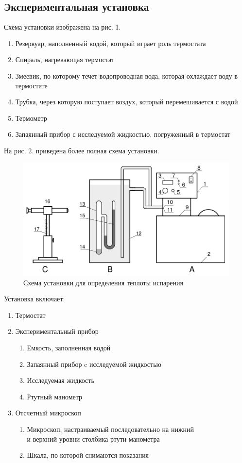 \documentclass[a4paper,12pt]{article}
\theoremstyle{plain} %
\theoremstyle{definition} %
\theoremstyle{remark} %
\begin{document}
\subsection{Экспериментальная установка}
\noindent Схема установки изображена на рис. 1. 
\begin{enumerate}[label=\arabic* --]
\item Резервуар, наполненный водой, который играет роль термостата
\item  Спираль, нагревающая термостат
\item Змеевик, по которому течет водопроводная вода, которая охлаждает воду в термостате
\item Трубка, через которую поступает воздух, который перемешивается с водой
\item Термометр
\item Запаянный прибор с исследуемой жидкостью, погруженный в термостат
\end{enumerate}
На рис. 2. приведена более полная схема установки.
\begin{figure}[H]
	\begin{center}
	\includegraphics[width=0.7\linewidth]{2}
	\captionsetup{justification=centering}
	\caption{Схема установки для определения теплоты испарения}
	\end{center}
\end{figure}
\noindent Установка включает:
\setcounter{label}{12}
\begin{enumerate}[label=\Alph* --]
	\item Термостат
	\item Экспериментальный прибор
	\begin{enumerate}[label=\arabic{label} --]
		\item Емкость, заполненная водой
		\addtocounter{label}{1}
		\item Запаянный прибор c исследуемой жидкостью
		\addtocounter{label}{1}
		\item Исследуемая жидкость
		\addtocounter{label}{1}
		\item Ртутный манометр
		\addtocounter{label}{1}
	\end{enumerate}
	\item Отсчетный микроскоп
	\begin{enumerate}[label=\arabic{label} --]
		\item Микроскоп, настраиваемый последовательно на нижний\\ и верхний уровни столбика ртути манометра
		\addtocounter{label}{1}
		\item Шкала, по которой снимаются показания
	\end{enumerate}
\end{enumerate}
\end{document}
